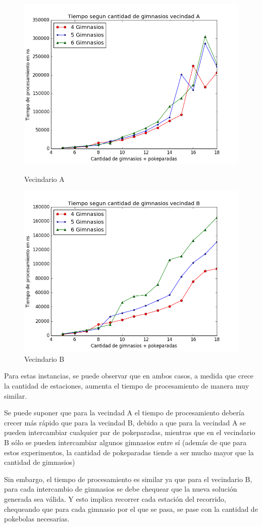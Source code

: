 \begin{figure}[H]
  \includegraphics[width=\linewidth]{imagenes/Ej3/Exp1Ej3a.png}
  \caption{Vecindario A}
\endminipage\hfill
{}%
  \includegraphics[width=\linewidth]{imagenes/Ej3/Exp1Ej3b.png}
  \caption{Vecindario B}
\endminipage
\end{figure}

\blindtext

Para estas instancias, se puede observar que en ambos casos, a medida que crece la cantidad de estaciones, aumenta el tiempo de procesamiento de manera muy similar.
\par Se puede suponer que para la vecindad A el tiempo de procesamiento debería crecer más rápido que para la vecindad B, debido a que para la vecindad A se pueden intercambiar cualquier par de pokeparadas, mientras que en el vecindario B sólo se pueden intercambiar algunos gimnasios entre sí (además de que para estos experimentos, la cantidad de pokeparadas tiende a ser mucho mayor que la cantidad de gimnasios)
\par Sin embargo, el tiempo de procesamiento es similar ya que para el vecindario B, para cada intercambio de gimnasios se debe chequear que la nueva solución generada sea válida. Y esto implica recorrer cada estación del recorrido, chequeando que para cada gimnasio por el que se pasa, se pase con la cantidad de pokebolas necesarias.


